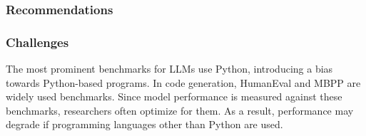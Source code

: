 \documentclass[11pt]{article}
\begin{document}

\subsubsection{Recommendations}









\subsubsection{Challenges}

The most prominent benchmarks for LLMs use Python, introducing a bias towards Python-based programs.
In code generation, HumanEval and MBPP are widely used benchmarks.
Since model performance is measured against these benchmarks, researchers often optimize for them.
As a result, performance may degrade if programming languages other than Python are used.
\end{document}

